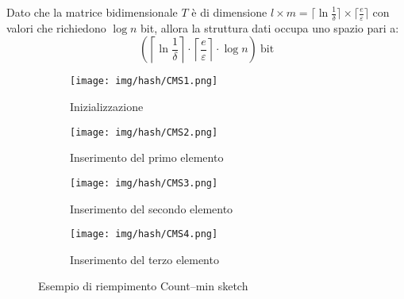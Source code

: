 Dato che la matrice bidimensionale $T$ è di dimensione
$l \times m = \lceil \ln \frac{1}{\delta} \rceil \times \lceil \frac{e}{\varepsilon} \rceil$
con valori che richiedono $\log n$ bit, allora la struttura dati occupa uno spazio pari a:
\begin{equation}
    \left( \left\lceil \ln \frac{1}{\delta} \right\rceil \cdot \left\lceil \frac{e}{\varepsilon} \right\rceil \cdot \log n \right) \ \text{bit}
\end{equation}
\begin{figure}[!ht]
    \centering
    \begin{subfigure}[b]{0.45\textwidth}
        \centering
        \texttt{[image: img/hash/CMS1.png]}
        \caption{Inizializzazione}
    \end{subfigure}
    \hfill
    \begin{subfigure}[b]{0.45\textwidth}
        \centering
        \texttt{[image: img/hash/CMS2.png]}
        \caption{Inserimento del primo elemento}
    \end{subfigure}
    \hfill
    \begin{subfigure}[b]{0.45\textwidth}
        \centering
        \texttt{[image: img/hash/CMS3.png]}
        \caption{Inserimento del secondo elemento}
    \end{subfigure}
    \hfill
    \begin{subfigure}[b]{0.45\textwidth}
        \centering
        \texttt{[image: img/hash/CMS4.png]}
        \caption{Inserimento del terzo elemento}
    \end{subfigure}
    \caption{Esempio di riempimento Count–min sketch}
\end{figure}